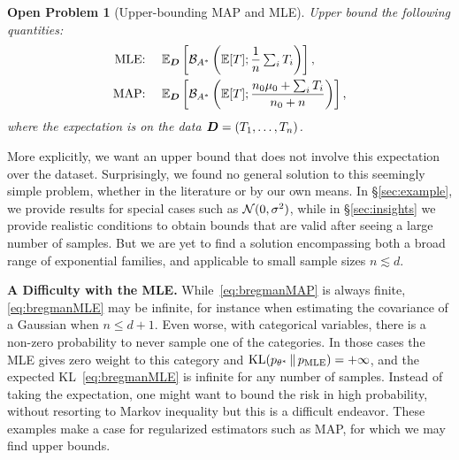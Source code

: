 \documentclass[twoside]{article}
\newtheorem{problem}{Open Problem}
\newcommand*{\expect}[2][]{\ensuremath{\mathbb{E}_{#1} \left[ #2 \right] }} %
\newcommand{\logpart}{A}
\newcommand{\bregmanconj}{\cB_{\logpart^*}}
\newcommand{\nat}{\theta}
\newcommand{\m}{\mu}
\begin{document}
\begin{problem}[Upper-bounding MAP and MLE]
Upper bound the following quantities:
\begin{align}
	\label{eq:bregmanMLE}
	\text{MLE: } \quad &\expect[\mD]{\bregmanconj \left (\E [T] ;  \inv{n}  \smallsum_i T_i \right )}, \\
	\label{eq:bregmanMAP}
	\text{MAP: } \quad &\expect[\mD]{\bregmanconj \left (\E [T] ; \frac{n_0 \m_0 + \smallsum_i T_i}{n_0+n} \right )},
\end{align}
where the expectation is on the data ${\bm{D}} = (T_1, \dots, T_n)$.
\end{problem}

More explicitly, we want an upper bound that does not involve this expectation over the dataset.
Surprisingly, we found no general solution to this seemingly simple problem, whether in the literature or by our own means.
In \S\ref{sec:example}, we provide results for special cases such as ${\mathcal N}(0, \sigma^2)$,
while in \S\ref{sec:insights} we provide realistic conditions to obtain bounds that are valid after seeing a large number of samples.
But we are yet to find a solution encompassing both a broad range of exponential families,
and applicable to small sample sizes $n \lesssim d$.

{\bf A Difficulty with the MLE.}
While~\eqref{eq:bregmanMAP} is always finite, \eqref{eq:bregmanMLE} may be infinite,
for instance when estimating the covariance of a Gaussian when $n \leq d + 1$.
Even worse, with categorical variables, there is a non-zero probability to never sample one of the categories.
In those cases the MLE gives zero weight to this category and $\KL(p_{\nat^*} \,\Vert\, p_\text{MLE} ) = +\infty$,
and the expected KL~\eqref{eq:bregmanMLE} is infinite for any number of samples.
Instead of taking the expectation, one might want to bound the risk in high probability,
without resorting to Markov inequality but this is a difficult endeavor.
These examples make a case for regularized estimators such as MAP,
for which we may find upper bounds.
\end{document}
